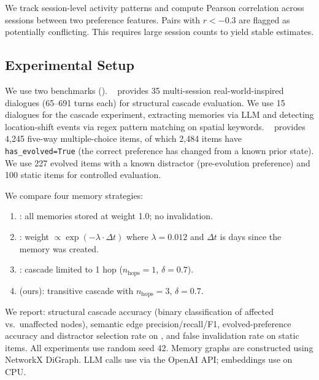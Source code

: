 We track session-level activity patterns and compute Pearson correlation across sessions between two preference features. Pairs with $r < -0.3$ are flagged as potentially conflicting. This requires large session counts to yield stable estimates.

\subsection{Experimental Setup}
\label{sec:method:setup}

We use two benchmarks (). \locomo~\cite{maharana2024locomo} provides 35 multi-session real-world-inspired dialogues (65--691 turns each) for structural cascade evaluation. We use 15 dialogues for the cascade experiment, extracting memories via LLM and detecting location-shift events via regex pattern matching on spatial keywords. \horizonbench~\cite{li2026horizonbench} provides 4,245 five-way multiple-choice items, of which 2,484 items have \texttt{has\_evolved=True} (the correct preference has changed from a known prior state). We use 227 evolved items with a known distractor (pre-evolution preference) and 100 static items for controlled evaluation.

We compare four memory strategies:
\begin{enumerate}[itemsep=2pt]
    \item \textbf{\flatmemory}: all memories stored at weight 1.0; no invalidation.
    \item \textbf{\recencydecay}: weight $\propto \exp(-\lambda \cdot \Delta t)$ where $\lambda = 0.012$ and $\Delta t$ is days since the memory was created.
    \item \textbf{\onehop}: \conflictswith cascade limited to 1 hop ($n_{\text{hops}} = 1$, $\delta = 0.7$).
    \item \textbf{\fullcascade} (ours): transitive cascade with $n_{\text{hops}} = 3$, $\delta = 0.7$.
\end{enumerate}

We report: structural cascade accuracy (binary classification of affected vs.\ unaffected nodes), semantic edge precision/recall/F1, evolved-preference accuracy and distractor selection rate on \horizonbench, and false invalidation rate on static items. All experiments use random seed 42. Memory graphs are constructed using NetworkX DiGraph. LLM calls use \gptfouromini via the OpenAI API; embeddings use \miniLM on CPU.
